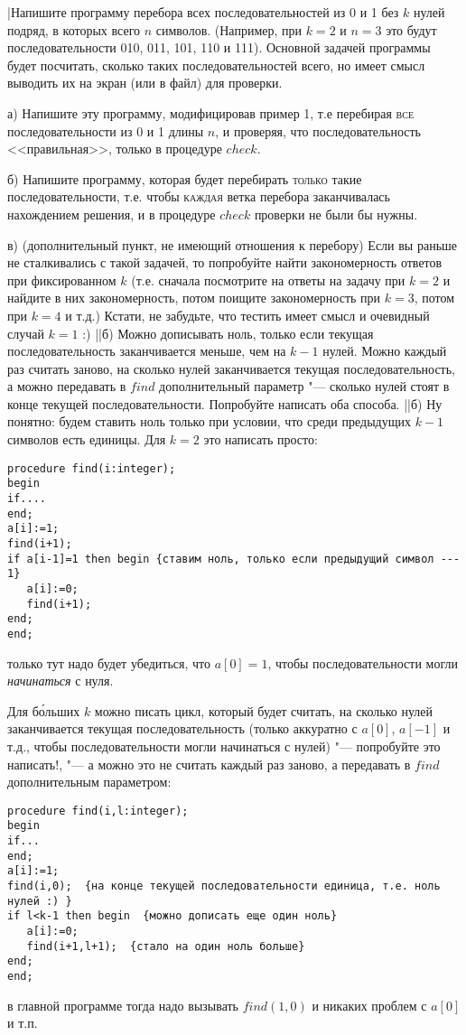 \task|Напишите программу перебора всех последовательностей из 0 и 1 без $k$ 
нулей подряд, в которых всего $n$ символов. (Например, при $k=2$ и $n=3$ это будут 
последовательности 010, 011, 101, 110 и 111). Основной задачей программы будет посчитать, 
сколько таких последовательностей всего, но имеет смысл выводить их на экран (или в 
файл) для проверки.\par
а) Напишите эту программу, модифицировав пример 1, т.е перебирая \textsc{все} 
последовательности из 0 и 1 длины $n$, и проверяя, что последовательность 
<<правильная>>, только в процедуре $check$.\par
б) Напишите программу, которая будет перебирать \textsc{только} такие 
последовательности, т.е. чтобы \textsc{каждая} ветка перебора заканчивалась 
нахождением решения, и в процедуре $check$ проверки не были бы нужны.\par
в) (дополнительный пункт, не имеющий отношения к перебору) Если вы раньше не сталкивались с такой задачей, то
попробуйте найти закономерность ответов при фиксированном $k$ (т.е. сначала
посмотрите на ответы на задачу при $k=2$ и найдите в них закономерность, потом
поищите закономерность при $k=3$, потом при $k=4$ и т.д.) Кстати, не забудьте, что 
тестить имеет смысл и очевидный случай $k=1$ :)
||б) Можно дописывать ноль, только если текущая последовательность заканчивается меньше, чем на $k-1$ нулей. Можно каждый раз считать заново, на сколько нулей заканчивается текущая последовательность, а можно передавать в $find$ дополнительный параметр "--- 
сколько нулей стоят в конце текущей последовательности. Попробуйте 
написать оба способа.
||б) Ну понятно: будем ставить ноль только при условии, что среди предыдущих $k-1$ символов есть единицы.
Для $k=2$ это написать просто:
\begin{codesampleo}\begin{verbatim}
procedure find(i:integer);
begin
if....
end;
a[i]:=1;
find(i+1);
if a[i-1]=1 then begin {ставим ноль, только если предыдущий символ --- 1}
   a[i]:=0;
   find(i+1);
end;
end;
\end{verbatim}\end{codesampleo}
только тут надо будет убедиться, что $a[0]=1$, чтобы последовательности могли \textit{начинаться} с нуля.

Для б\'{о}льших $k$ можно писать цикл, который будет считать, на сколько нулей заканчивается текущая последовательность (только аккуратно с $a[0]$, $a[-1]$ и т.д., чтобы 
последовательности могли начинаться с нулей) "--- попробуйте это написать!, "--- а можно это не считать каждый раз заново, а передавать в $find$ дополнительным параметром:
\begin{codesampleo}\begin{verbatim}
procedure find(i,l:integer);
begin
if...
end;
a[i]:=1;
find(i,0);  {на конце текущей последовательности единица, т.е. ноль нулей :) }
if l<k-1 then begin  {можно дописать еще один ноль}
   a[i]:=0;
   find(i+1,l+1);  {стало на один ноль больше}
end;
end;
\end{verbatim}\end{codesampleo}
в главной программе тогда надо вызывать $find(1,0)$ и никаких проблем с $a[0]$ и т.п.

